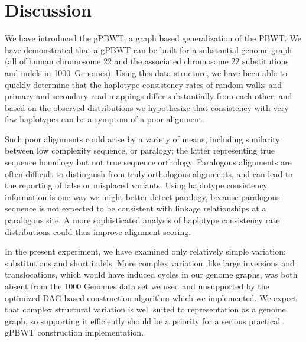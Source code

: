 \section{Discussion}

We have introduced the gPBWT, a graph based generalization of the PBWT. We have demonstrated that a gPBWT can be built for a substantial genome graph (all of human chromosome 22 and the associated chromosome 22 substitutions and indels in 1000~Genomes). Using this data structure, we have been able to quickly determine that the haplotype consistency rates of random walks and primary and secondary read mappings differ substantially from each other, and based on the observed distributions we hypothesize that consistency with very few haplotypes can be a symptom of a poor alignment. 

Such poor alignments could arise by a variety of means, including similarity between low complexity sequence, or paralogy; the latter representing true sequence homology but not true sequence orthology. Paralogous alignments are often difficult to distinguish from truly orthologous alignments, and can lead to the reporting of false or misplaced variants. Using haplotype consistency information is one way we might better detect paralogy, because paralogous sequence is not expected to be consistent with linkage relationships at a paralogous site. A more sophisticated analysis of haplotype consistency rate distributions could thus improve alignment scoring.

\begin{sloppypar}
In the present experiment, we have examined only relatively simple variation: substitutions and short indels. More complex variation, like large inversions and translocations, which would have induced cycles in our genome graphs, was both absent from the 1000 Genomes data set we used and unsupported by the optimized DAG-based construction algorithm which we implemented. We expect that complex structural variation is well suited to representation as a genome graph, so supporting it efficiently should be a priority for a serious practical gPBWT construction implementation.
\end{sloppypar}

